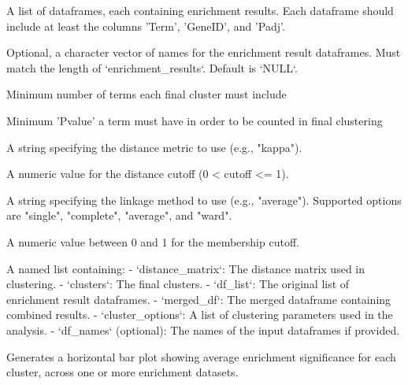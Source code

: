 \documentclass[a4paper]{book}
\begin{document}
\begin{Arguments}
\begin{ldescription}
\item[\code{enrichment\_results}] A list of dataframes, each containing enrichment results.
Each dataframe should include at least the columns 'Term', 'GeneID', and 'Padj'.

\item[\code{df\_names}] Optional, a character vector of names for the enrichment result dataframes. Must
match the length of `enrichment\_results`. Default is `NULL`.

\item[\code{min\_terms}] Minimum number of terms each final cluster must include

\item[\code{min\_value}] Minimum 'Pvalue' a term must have in order to be counted in final clustering

\item[\code{distance\_metric}] A string specifying the distance metric to use (e.g., "kappa").

\item[\code{distance\_cutoff}] A numeric value for the distance cutoff (0 < cutoff <= 1).

\item[\code{linkage\_method}] A string specifying the linkage method to use
(e.g., "average"). Supported options are "single", "complete",
"average", and "ward".

\item[\code{linkage\_cutoff}] A numeric value between 0 and 1 for the membership cutoff.
\end{ldescription}
\end{Arguments}
%
\begin{Value}
A named list containing:
- `distance\_matrix`: The distance matrix used in clustering.
- `clusters`: The final clusters.
- `df\_list`: The original list of enrichment result dataframes.
- `merged\_df`: The merged dataframe containing combined results.
- `cluster\_options`: A list of clustering parameters used in the analysis.
- `df\_names` (optional): The names of the input dataframes if provided.
\end{Value}
%
\begin{Description}
Generates a horizontal bar plot showing average enrichment significance
for each cluster, across one or more enrichment datasets.
\end{Description}
\end{document}
